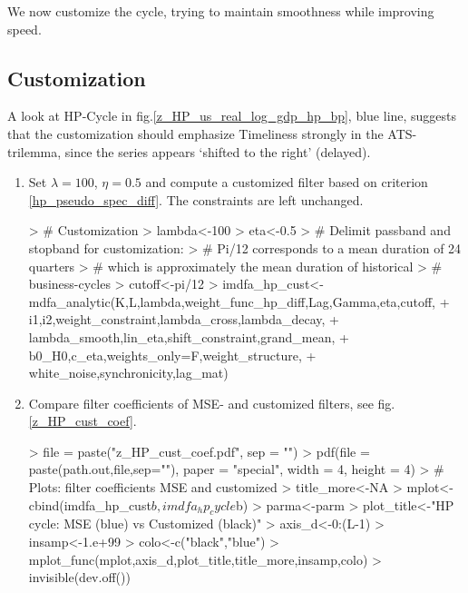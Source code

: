 \documentclass[a4paper]{book}
\begin{document}
We now customize the cycle, trying to maintain smoothness while improving speed.



\subsection{Customization}


A look at HP-Cycle in fig.\ref{z_HP_us_real_log_gdp_hp_bp}, blue line, suggests that the customization should emphasize Timeliness strongly in the ATS-trilemma, since the series appears `shifted to the right' (delayed).

\begin{enumerate}
\item Set $\lambda=100$, $\eta=0.5$ and compute a customized filter based on criterion \ref{hp_pseudo_spec_diff}. The constraints are left unchanged. 
\begin{Schunk}
\begin{Sinput}
> # Customization
> lambda<-100
> eta<-0.5
> # Delimit passband and stopband for customization:
> #   Pi/12 corresponds to a mean duration of 24 quarters
> #   which is approximately the mean duration of historical 
> #   business-cycles
> cutoff<-pi/12
> imdfa_hp_cust<-mdfa_analytic(K,L,lambda,weight_func_hp_diff,Lag,Gamma,eta,cutoff,
+                         i1,i2,weight_constraint,lambda_cross,lambda_decay,
+                         lambda_smooth,lin_eta,shift_constraint,grand_mean,
+                         b0_H0,c_eta,weights_only=F,weight_structure,
+                         white_noise,synchronicity,lag_mat)
\end{Sinput}
\end{Schunk}
\item Compare filter coefficients of MSE- and customized filters, see fig.\ref{z_HP_cust_coef}.
\begin{Schunk}
\begin{Sinput}
> file = paste("z_HP_cust_coef.pdf", sep = "")
> pdf(file = paste(path.out,file,sep=""), paper = "special", width = 4, height = 4)
> # Plots: filter coefficients MSE and customized
> title_more<-NA
> mplot<-cbind(imdfa_hp_cust$b,imdfa_hp_cycle$b)
> parma<-parm
> plot_title<-"HP cycle: MSE (blue) vs Customized (black)"
> axis_d<-0:(L-1)
> insamp<-1.e+99
> colo<-c("black","blue")
> mplot_func(mplot,axis_d,plot_title,title_more,insamp,colo)
> invisible(dev.off())
\end{Sinput}
\end{Schunk}

\end{enumerate}
\end{document}
